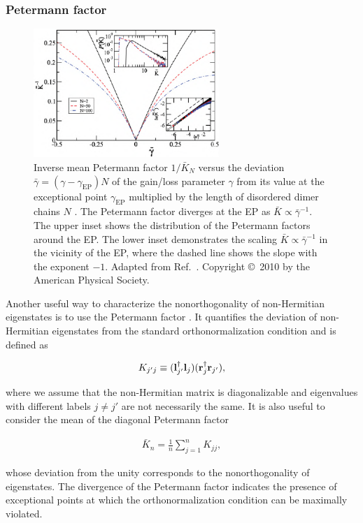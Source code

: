 \documentclass{tADP2e}
\theoremstyle{plain}
\newcommand{\eqn}[1]{
\begin{eqnarray}
	#1
\end{eqnarray}
}
\theoremstyle{plain}
\theoremstyle{definition}
\begin{document}
\subsubsection{Petermann factor\label{sec2peter}}
\begin{figure}
\begin{center}
\includegraphics[width=7cm]{./Figures/fig_2_petermann.pdf}
\end{center}
\caption{Inverse mean Petermann factor $1/\bar{K}_N$ versus the deviation $\bar{\gamma}=(\gamma-\gamma_\mathrm{EP}){N}$ of the gain/loss parameter $\gamma$ from its value at the exceptional point $\gamma_\mathrm{EP}$ multiplied by the length of disordered dimer chains ${N}$ \cite{ZMC10}. The Petermann factor diverges at the EP as $\bar{K}\propto\bar{\gamma}^{-1}$. The upper inset shows the distribution of the Petermann factors around the EP. The lower inset demonstrates the scaling $\bar{K}\propto \bar{\gamma}^{-1}$ in the vicinity of the EP, where the dashed line shows the slope with the exponent $-1$. Adapted from Ref.~\cite{ZMC10}. Copyright \copyright\,  2010 by the American Physical Society.
}
\label{fig:2petermann}
\end{figure}
Another useful way to characterize the nonorthogonality of non-Hermitian eigenstates is to use the Petermann factor \cite{KP79}. It quantifies the deviation of non-Hermitian eigenstates from the standard orthonormalization condition and is defined as
\eqn{
K_{j'j}\equiv({\bold l}_{j'}^{\dagger}{\bold l}_{j})({\bold r}_{j}^{\dagger}{\bold r}_{j'}),
}
where we assume that the non-Hermitian matrix is diagonalizable and eigenvalues with different labels $j\neq j'$ are not necessarily the same.  It is also useful to consider the mean of the diagonal Petermann factor \cite{ZMC10}
\eqn{
\bar{K}_n=\frac{1}{n}\sum_{j=1}^{n}K_{jj},
}
whose deviation from the unity corresponds to the nonorthogonality of eigenstates.
The divergence of the Petermann factor indicates the presence of exceptional points at which the orthonormalization condition can be maximally violated.
\end{document}
